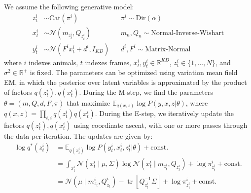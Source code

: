 \documentclass{article}         %
\DeclareMathOperator{\tr}{tr}
\begin{document}
We assume the following generative model:
\begin{align}
    z_t^i & \sim \text{Cat}(\pi^i) && 
    \pi^i \sim \text{Dir}(\alpha) \\
    x_t^i & \sim \mathcal{N}(m_{z_t^i}, Q_{z_t^i}) &&
    m_n, Q_n \sim \text{Normal-Inverse-Wishart} \\
    y_t^i & \sim \mathcal{N}(F^i x_t^i + d^i, I_{KD}) && 
    d^i, F^i \sim \text{Matrix-Normal}   
\end{align}
%
where $i$ indexes animals, $t$ indexes frames, $x_t^i, y_t^i \in \mathbb{R}^{KD}$, $z_t^i \in \{1,...,N\}$, and $\sigma^2 \in \mathbb{R}^+$ is fixed. The parameters can be optimized using variation mean field EM, in which the posterior over latent variables is approximated by the product of factors $q(z_t^i), q(x_t^i)$. During the M-step, we find the parameters $\theta = (m, Q, d, F, \pi)$  that maximize $\mathbb{E}_{q(x,z)} \log P(y,x,z | \theta)$, where $q(x,z) = \prod_{t,i} q(z_t^i) q(x_t^i)$. During the E-step, we iteratively update the factors $q(z_t^i), q(x_t^i)$ using coordinate ascent, with one or more passes through the data per iteration. The updates are given by:
\begin{align}
\log q^*(z_t^i) & = \mathbb{E}_{q(x_t^i)} \log P(y_t^i, x_t^i, z_t^i | \theta) + \text{const.} \\
& = \int_{x_t^i} \mathcal{N}(x_t^i \mid \mu, \Sigma) \log \mathcal{N}(x_t^i \mid m_{z_t^i}, Q_{z_t^i}) + \log \pi^i_{z_t^i} + \text{const.} \\
& = \mathcal{N}(\mu \mid m_{z_t}^i, Q_{z_t}^i) - \tr [Q_{z_t^i}^{-1}\Sigma] + \log \pi^i_{z_t^i} + \text{const.}
\end{align}
\end{document}
